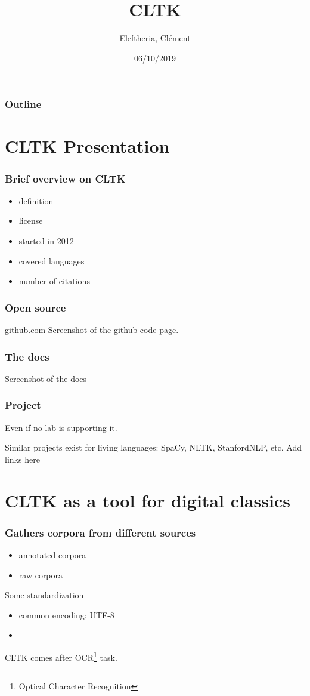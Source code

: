 \documentclass{beamer}
\title{CLTK}
\author{Eleftheria, Clément}
\institute{CLTK}
\date{06/10/2019}
\begin{document}
 
\begin{frame}
\titlepage
\end{frame}

\begin{frame}
\frametitle{Outline}
\tableofcontents
\end{frame}

\section{CLTK Presentation}

\begin{frame}
\frametitle{Brief overview on CLTK}
\begin{itemize}
    \item definition
    \item license
    \item started in 2012
    \item covered languages
    \item number of citations
\end{itemize}


\end{frame}

\begin{frame}
\frametitle{Open source}
\href{http://github.com}{github.com}
Screenshot of the github code page.

\end{frame}

\begin{frame}
\frametitle{The docs}

Screenshot of the docs

\end{frame}


\begin{frame}
\frametitle{Project}


Even if no lab is supporting it.

Similar projects exist for living languages: SpaCy, NLTK, StanfordNLP, etc. Add links here 
\end{frame}
\section{CLTK as a tool for digital classics}

\begin{frame}
\frametitle{Gathers corpora from different sources}
\begin{itemize}
    \item annotated corpora
    \item raw corpora
\end{itemize}
Some standardization
\begin{itemize}
    \item common encoding: UTF-8
    \item 
\end{itemize}


CLTK comes after OCR\footnote{Optical Character Recognition} task.
\end{frame}
\end{document}
